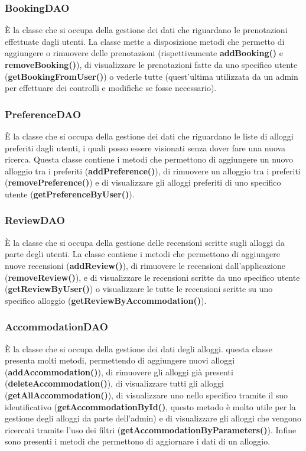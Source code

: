 \documentclass[10pt]{article}
\begin{document}
\subsubsection{BookingDAO}

\`E la classe che si occupa della gestione dei dati che riguardano le prenotazioni effettuate dagli utenti. La classe mette a disposizione metodi che permetto di aggiungere o rimuovere delle prenotazioni (rispettivamente \textbf{addBooking()} e \textbf{removeBooking()}), di visualizzare le prenotazioni fatte da uno specifico utente (\textbf{getBookingFromUser()}) o vederle tutte (quest'ultima utilizzata da un admin per effettuare dei controlli e modifiche se fosse necessario).

\subsubsection{PreferenceDAO}

\`E la classe che si occupa della gestione dei dati che riguardano le liste di alloggi preferiti dagli utenti, i quali posso essere visionati senza dover fare una nuova ricerca. Questa classe contiene i metodi che permettono di aggiungere un nuovo alloggio tra i preferiti (\textbf{addPreference()}), di rimuovere un alloggio tra i preferiti (\textbf{removePreference()}) e di visualizzare gli alloggi preferiti di uno specifico utente (\textbf{getPreferenceByUser()}). 

\subsubsection{ReviewDAO}

\`E la classe che si occupa della gestione delle recensioni scritte sugli alloggi da parte degli utenti. La classe contiene i metodi che permettono di aggiungere nuove recensioni (\textbf{addReview()}), di rimuovere le recensioni dall'applicazione (\textbf{removeReview()}), e di visualizzare le recensioni scritte da uno specifico utente (\textbf{getReviewByUser()}) o visualizzare le tutte le recensioni scritte su uno specifico alloggio (\textbf{getReviewByAccommodation()}). 

\subsubsection{AccommodationDAO}

\`E la classe che si occupa della gestione dei dati degli alloggi. questa classe presenta molti metodi, permettendo di aggiungere nuovi alloggi (\textbf{addAccommodation()}), di rimuovere gli alloggi già presenti (\textbf{deleteAccommodation()}), di visualizzare tutti gli alloggi (\textbf{getAllAccommodation()}), di visualizzare uno nello specifico tramite il suo identificativo (\textbf{getAccommodationById()}, questo metodo è molto utile per la gestione degli alloggi da parte dell'admin) e di visualizzare gli alloggi che vengono ricercati tramite l'uso dei filtri (\textbf{getAccommodationByParameters()}). Infine sono presenti i metodi che permettono di aggiornare i dati di un alloggio. 
\end{document}
